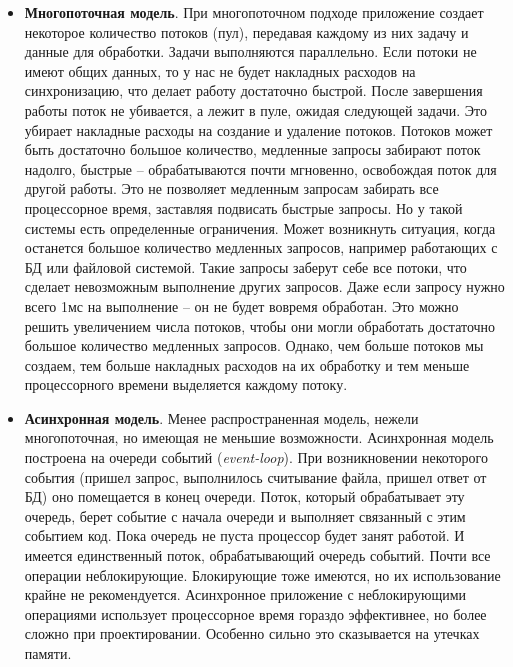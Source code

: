 \documentclass[a4paper]{article}
\begin{document}
			\begin{itemize}
				\item {\textbf{Многопоточная модель}}. При многопоточном подходе приложение создает некоторое количество потоков (пул), передавая каждому из них задачу и данные для обработки. Задачи выполняются параллельно. Если потоки не имеют общих данных, то у нас не будет накладных расходов на синхронизацию, что делает работу достаточно быстрой. После завершения работы поток не убивается, а лежит в пуле, ожидая следующей задачи. Это убирает накладные расходы на создание и удаление потоков. Потоков может быть достаточно большое количество, медленные запросы забирают поток надолго, быстрые -- обрабатываются почти мгновенно, освобождая поток для другой работы. Это не позволяет медленным запросам забирать все процессорное время, заставляя подвисать быстрые запросы. Но у такой системы есть определенные ограничения. Может возникнуть ситуация, когда останется большое количество медленных запросов, например работающих с БД или файловой системой. Такие запросы заберут себе все потоки, что сделает невозможным выполнение других запросов. Даже если запросу нужно всего 1мс на выполнение -- он не будет вовремя обработан. Это можно решить увеличением числа потоков, чтобы они могли обработать достаточно большое количество медленных запросов. Однако, чем больше потоков мы создаем, тем больше накладных расходов на их обработку и тем меньше процессорного времени выделяется каждому потоку.
				\item {\textbf{Асинхронная модель}}. Менее распространенная модель, нежели многопоточная, но имеющая не меньшие возможности. Асинхронная модель построена на очереди событий (\emph{event-loop}). При возникновении некоторого события (пришел запрос, выполнилось считывание файла, пришел ответ от БД) оно помещается в конец очереди. Поток, который обрабатывает эту очередь, берет событие с начала очереди и выполняет связанный с этим событием код. Пока очередь не пуста процессор будет занят работой. И имеется единственный поток, обрабатывающий очередь событий. Почти все операции неблокирующие. Блокирующие тоже имеются, но их использование крайне не рекомендуется. Асинхронное приложение с неблокирующими операциями использует процессорное время гораздо эффективнее, но более сложно при проектировании. Особенно сильно это сказывается на утечках памяти.

\end{itemize}
\end{document}
